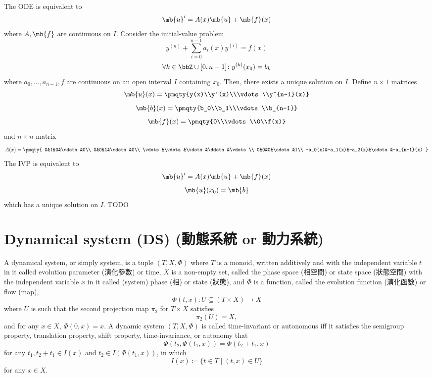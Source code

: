 \documentclass[a4paper,12pt]{report}
\begin{document}
The ODE is equivalent to
\[\mb{u}'=A(x)\mb{u}+\mb{f}(x)\]
where $A,\mb{f}$ are continuous on $I$.
Consider the initial-value problem
\[y^{(n)}+\sum_{i=0}^{n-1}a_i(x)y^{(i)}=f(x)\]
\[\forall k\in\bbZ\cup[0,n-1]\colon y^{(k)}(x_0)=b_k\]
where $a_0,\ldots,a_{n-1},f$ are continuous on an open interval $I$ containing $x_0$. Then, there exists a unique solution on $I$.
\bpr
Define $n\times 1$ matrices
\[\mb{u}(x)=\pmqty{y(x)\\y'(x)\\\vdots\\y^{n-1}(x)}\]
\[\mb{b}(x)=\pmqty{b_0\\b_1\\\vdots\\b_{n-1}}\]
\[\mb{f}(x)=\pmqty{0\\\vdots\\0\\f(x)}\]
and $n\times n$ matrix
\[A(x)=\pmqty{
0&1&0&\cdots&0\\
0&0&1&\cdots&0\\
\vdots&\vdots&\vdots&\ddots&\vdots\\
0&0&0&\cdots&1\\
-a_0(x)&-a_1(x)&-a_2(x)&\cdots&-a_{n-1}(x)
}\]
The IVP is equivalent to
\[\mb{u}'=A(x)\mb{u}+\mb{f}(x)\]
\[\mb{u}(x_0)=\mb{b}\]
which has a unique solution on $I$.
\epr
{}
TODO
\section{Dynamical system (DS) (動態系統 or 動力系統)}
A dynamical system, or simply system, is a tuple $(T, X, \Phi)$ where $T$ is a monoid, written additively and with the independent variable $t$ in it called evolution parameter (演化參數) or time, $X$ is a non-empty set, called the phase space (相空間) or state space (狀態空間) with the independent variable $x$ in it called (system) phase (相) or state (狀態), and $\Phi$ is a function, called the evolution function (演化函數) or flow (map),
\[\Phi(t,x)\colon U\subseteq(T\times X)\to X\]
where $U$ is such that the second projection map $\pi_2$ for $T\times X$ satisfies
\[\pi_2(U)=X,\]
and for any $x \in X$, $\Phi (0,x)=x$.
A dynamic system $(T, X, \Phi)$ is called time-invariant or autonomous iff it satisfies the semigroup property, translation property, shift property, time-invariance, or autonomy that
\[\Phi (t_{2},\Phi (t_{1},x))=\Phi (t_{2}+t_{1},x)\]
for any $t_{1},t_{2}+t_{1}\in I(x)$ and $t_{2}\in I(\Phi (t_{1},x))$, in which
\[I(x)\coloneq\{t\in T\mid(t,x)\in U\}\]
for any $x\in X$.
\end{document}
